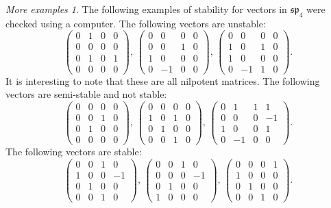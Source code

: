 \documentclass[12pt]{amsart}
\theoremstyle{remark}
\theoremstyle{remark}
\theoremstyle{remark}
\newtheorem*{moreexamples}{More examples}
\begin{document}
\begin{moreexamples}
The following examples of stability for vectors in $\mathfrak{sp}_4$ were checked using a computer.
The following vectors are unstable:
$$
\begin{pmatrix} 
	0 & 1 & 0 & 0 \\ 
	0 & 0 & 0 & 0 \\
	0 & 1 & 0 & 1 \\
	0 & 0 & 0 & 0
\end{pmatrix}, \, 
\begin{pmatrix} 
	0 & 0 & 0 & 0 \\ 
	0 & 0 & 1 & 0 \\
	1 & 0 & 0 & 0 \\
	0 & -1 & 0 & 0
\end{pmatrix}, \, 
\begin{pmatrix} 
	0 & 0 & 0 & 0 \\ 
	1 & 0 & 1 & 0 \\
	1 & 0 & 0 & 0 \\
	0 & -1 & 1 & 0
\end{pmatrix}.
$$
It is interesting to note that these are all nilpotent matrices.
The following vectors are semi-stable and not stable:
$$
\begin{pmatrix} 
	0 & 0 & 0 & 0 \\ 
	0 & 0 & 1 & 0 \\
	0 & 1 & 0 & 0 \\
	0 & 0 & 0 & 0
\end{pmatrix}, \, 
\begin{pmatrix} 
	0 & 0 & 0 & 0 \\ 
	1 & 0 & 1 & 0 \\
	0 & 1 & 0 & 0 \\
	0 & 0 & 1 & 0
\end{pmatrix}, \, 
\begin{pmatrix} 
	0 & 1 & 1 & 1 \\ 
	0 & 0 & 0 & -1 \\
	1 & 0 & 0 & 1 \\
	0 & -1 & 0 & 0
\end{pmatrix}.
$$
The following vectors are stable:
$$
\begin{pmatrix} 
	0 & 0 & 1 & 0 \\ 
	1 & 0 & 0 & -1 \\
	0 & 1 & 0 & 0 \\
	0 & 0 & 1 & 0
\end{pmatrix}, \,
\begin{pmatrix} 
	0 & 0 & 1 & 0 \\ 
	0 & 0 & 0 & -1 \\
	0 & 1 & 0 & 0 \\
	1 & 0 & 0 & 0
\end{pmatrix}, \, 
\begin{pmatrix} 
	0 & 0 & 0 & 1 \\ 
	1 & 0 & 0 & 0 \\
	0 & 1 & 0 & 0 \\
	0 & 0 & 1 & 0
\end{pmatrix}.
$$ 
\end{moreexamples}
\end{document}

